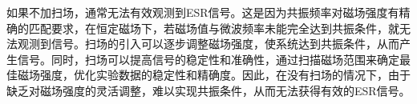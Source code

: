 \documentclass[dvipsnames, svgnames,a4paper,11pt]{article}
\begin{document}
如果不加扫场，通常无法有效观测到ESR信号。这是因为共振频率对磁场强度有精确的匹配要求，在恒定磁场下，若磁场值与微波频率未能完全达到共振条件，就无法观测到信号。扫场的引入可以逐步调整磁场强度，使系统达到共振条件，从而产生信号。同时，扫场可以提高信号的稳定性和准确性，通过扫描磁场范围来确定最佳磁场强度，优化实验数据的稳定性和精确度。因此，在没有扫场的情况下，由于缺乏对磁场强度的灵活调整，难以实现共振条件，从而无法获得有效的ESR信号。












\end{document}
